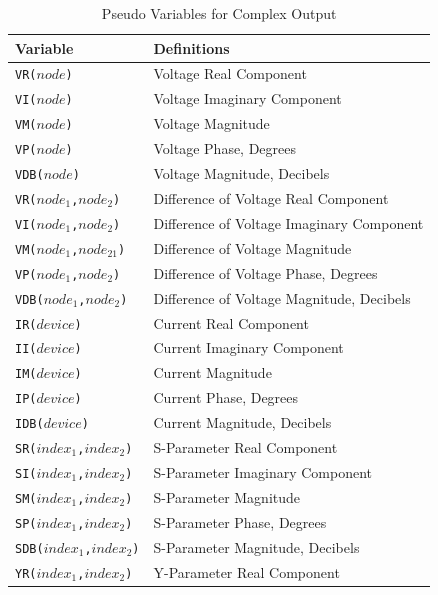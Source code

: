 \begin{table}[!htb]
  \caption{Pseudo Variables for Complex Output}
  \label{Print_Complex}
  \begin{tabularx}{\linewidth}{|Y|Y|}
     \color{white}\textbf{Variable} & \color{white}\textbf{Definitions} \\ \hline
    \texttt{VR($node$)} & Voltage Real Component \\ \hline
    \texttt{VI($node$)} & Voltage Imaginary Component \\ \hline
    \texttt{VM($node$)} & Voltage Magnitude \\ \hline
    \texttt{VP($node$)} & Voltage Phase, Degrees \\ \hline
    \texttt{VDB($node$)} & Voltage Magnitude, Decibels \\ \hline
    \texttt{VR($node_1$,$node_2$)} & Difference of Voltage Real Component \\ \hline
    \texttt{VI($node_1$,$node_2$)} & Difference of Voltage Imaginary Component \\ \hline
    \texttt{VM($node_1$,$node_21$)} & Difference of Voltage Magnitude \\ \hline
    \texttt{VP($node_1$,$node_2$)} & Difference of Voltage Phase, Degrees \\ \hline
    \texttt{VDB($node_1$,$node_2$)} & Difference of Voltage Magnitude, Decibels \\ \hline
    \texttt{IR($device$)} & Current Real Component \\ \hline
    \texttt{II($device$)} & Current Imaginary Component \\ \hline
    \texttt{IM($device$)} & Current Magnitude \\ \hline
    \texttt{IP($device$)} & Current Phase, Degrees \\ \hline
    \texttt{IDB($device$)} & Current Magnitude, Decibels \\ \hline
    \texttt{SR($index_1$,$index_2$)} & S-Parameter Real Component \\ \hline
    \texttt{SI($index_1$,$index_2$)} & S-Parameter Imaginary Component \\ \hline
    \texttt{SM($index_1$,$index_2$)} & S-Parameter Magnitude \\ \hline
    \texttt{SP($index_1$,$index_2$)} & S-Parameter Phase, Degrees \\ \hline
    \texttt{SDB($index_1$,$index_2$)} & S-Parameter Magnitude, Decibels \\ \hline
    \texttt{YR($index_1$,$index_2$)} & Y-Parameter Real Component \\ \hline

\end{tabularx}
\end{table}
